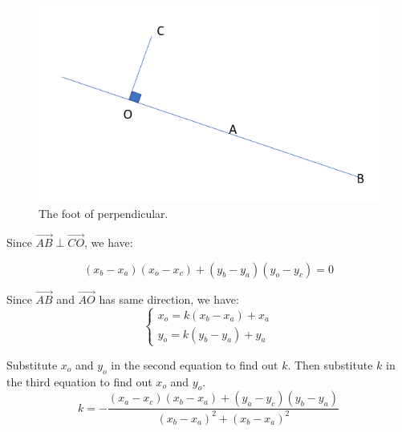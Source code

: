 \begin{figure}[thb]
    \centering
    \includegraphics[width=1\textwidth]{images/implementofhiding2.png}
    \caption[The foot of perpendicular]{The foot of perpendicular.}\label{hiding_implement2}
\end{figure}
Since $\overrightarrow{AB} \perp  \overrightarrow{CO}$, we have:

\begin{equation}
(x_{b}-x_{a})(x_{o}-x_{c})+(y_{b}-y_{a})(y_{o}-y_{c})=0
\end{equation}

Since $\overrightarrow{AB}$ and $\overrightarrow{AO}$ has same direction, we have:
\begin{equation}
\left\{\begin{matrix}
x_{o}=k({x_{b}}-{x_{a}})+{x_{a}}\\
y_{o}=k({y_{b}}-{y_{a}})+{y_{a}}
\end{matrix}\right.
\end{equation}

Substitute $x_o$ and $y_o$ in the second equation to find out $k$. Then substitute $k$ in the third equation to find out $x_o$ and $y_o$.
\begin{equation}
    k=-\frac{(x_{a}-x_{c})(x_{b}-x_{a})+(y_{a}-y_{c})(y_{b}-y_{a})}{(x_{b}-x_{a})^{2}+(x_{b}-x_{a})^{2}}
\end{equation}

